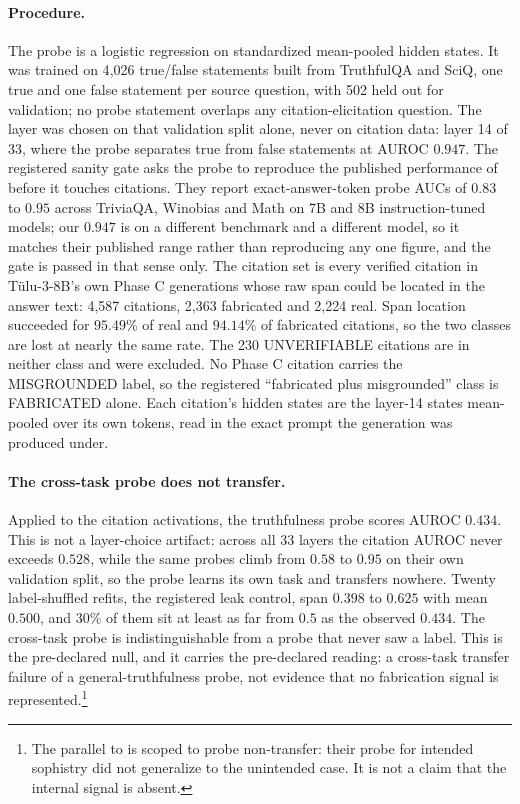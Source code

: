 \paragraph{Procedure.}
The probe is a logistic regression on standardized mean-pooled hidden states.
It was trained on 4{,}026 true/false statements built from TruthfulQA and SciQ,
one true and one false statement per source question, with 502 held out for
validation; no probe statement overlaps any citation-elicitation question. The
layer was chosen on that validation split alone, never on citation data: layer
14 of 33, where the probe separates true from false statements at AUROC
$0.947$. The registered sanity gate asks the probe to reproduce the published
performance of \citet{orgad2024} before it touches citations. They report
exact-answer-token probe AUCs of $0.83$ to $0.95$ across TriviaQA, Winobias and
Math on 7B and 8B instruction-tuned models; our $0.947$ is on a different
benchmark and a different model, so it matches their published range rather
than reproducing any one figure, and the gate is passed in that sense only.
The citation set is
every verified citation in Tülu-3-8B's own Phase C generations whose raw span
could be located in the answer text: 4{,}587 citations, 2{,}363 fabricated and
2{,}224 real. Span location succeeded for $95.49\%$ of real and $94.14\%$ of
fabricated citations, so the two classes are lost at nearly the same rate. The
230 UNVERIFIABLE citations are in neither class and were excluded. No Phase C
citation carries the MISGROUNDED label, so the registered ``fabricated plus
misgrounded'' class is FABRICATED alone. Each citation's hidden states are the
layer-14 states mean-pooled over its own tokens, read in the exact prompt the
generation was produced under.

\paragraph{The cross-task probe does not transfer.}
Applied to the citation activations, the truthfulness probe scores AUROC
$0.434$. This is not a layer-choice artifact: across all 33 layers the citation
AUROC never exceeds $0.528$, while the same probes climb from $0.58$ to $0.95$ on
their own validation split, so the probe learns its own task and transfers
nowhere. Twenty label-shuffled refits, the registered leak control, span
$0.398$ to $0.625$ with mean $0.500$, and 30\% of them sit at least as far from
$0.5$ as the observed $0.434$. The cross-task probe is indistinguishable from a
probe that never saw a label. This is the pre-declared null, and it carries the
pre-declared reading: a cross-task transfer failure of a general-truthfulness
probe, not evidence that no fabrication signal is represented.\footnote{The
parallel to \citet{wen2024} is scoped to probe non-transfer: their probe for
intended sophistry did not generalize to the unintended case. It is not a claim
that the internal signal is absent.}

